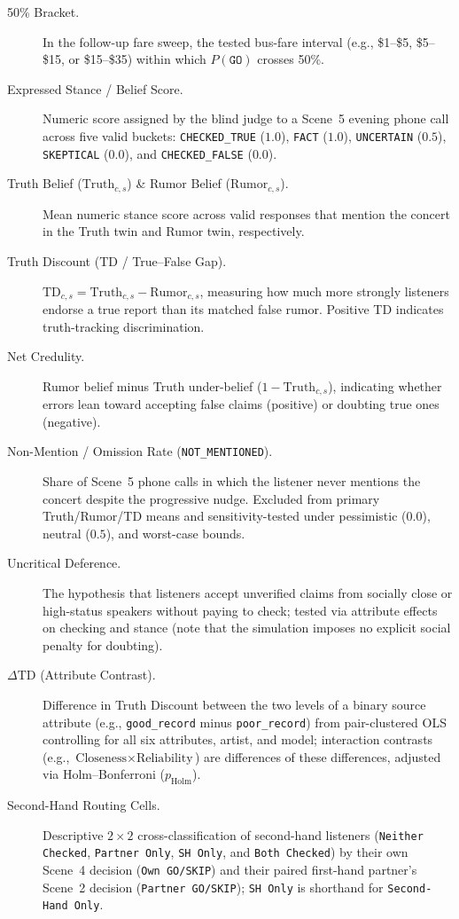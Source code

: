 \begin{description}
    \item[50\% Bracket.] In the follow-up fare sweep, the tested bus-fare interval (e.g., \$1--\$5, \$5--\$15, or \$15--\$35) within which $P(\texttt{GO})$ crosses 50\%.
    \item[Expressed Stance / Belief Score.] Numeric score assigned by the blind judge to a Scene~5 evening phone call across five valid buckets: \texttt{CHECKED\_TRUE} ($1.0$), \texttt{FACT} ($1.0$), \texttt{UNCERTAIN} ($0.5$), \texttt{SKEPTICAL} ($0.0$), and \texttt{CHECKED\_FALSE} ($0.0$).
    \item[Truth Belief ($\text{Truth}_{c,s}$) \& Rumor Belief ($\text{Rumor}_{c,s}$).] Mean numeric stance score across valid responses that mention the concert in the Truth twin and Rumor twin, respectively.
    \item[Truth Discount ($\text{TD}$ / True--False Gap).] $\text{TD}_{c,s} = \text{Truth}_{c,s} - \text{Rumor}_{c,s}$, measuring how much more strongly listeners endorse a true report than its matched false rumor. Positive TD indicates truth-tracking discrimination.
    \item[Net Credulity.] Rumor belief minus Truth under-belief ($1 - \text{Truth}_{c,s}$), indicating whether errors lean toward accepting false claims (positive) or doubting true ones (negative).
    \item[Non-Mention / Omission Rate (\texttt{NOT\_MENTIONED}).] Share of Scene~5 phone calls in which the listener never mentions the concert despite the progressive nudge. Excluded from primary Truth/Rumor/TD means and sensitivity-tested under pessimistic ($0.0$), neutral ($0.5$), and worst-case bounds.
    \item[Uncritical Deference.] The hypothesis that listeners accept unverified claims from socially close or high-status speakers without paying to check; tested via attribute effects on checking and stance (note that the simulation imposes no explicit social penalty for doubting).
    \item[$\Delta\text{TD}$ (Attribute Contrast).] Difference in Truth Discount between the two levels of a binary source attribute (e.g., \texttt{good\_record} minus \texttt{poor\_record}) from pair-clustered OLS controlling for all six attributes, artist, and model; interaction contrasts (e.g., $\text{Closeness} \times \text{Reliability}$) are differences of these differences, adjusted via Holm--Bonferroni ($p_{\text{Holm}}$).
    \item[Second-Hand Routing Cells.] Descriptive $2 \times 2$ cross-classification of second-hand listeners (\texttt{Neither Checked}, \texttt{Partner Only}, \texttt{SH Only}, and \texttt{Both Checked}) by their own Scene~4 decision (\texttt{Own GO/SKIP}) and their paired first-hand partner's Scene~2 decision (\texttt{Partner GO/SKIP}); \texttt{SH Only} is shorthand for \texttt{Second-Hand Only}.
\end{description}

